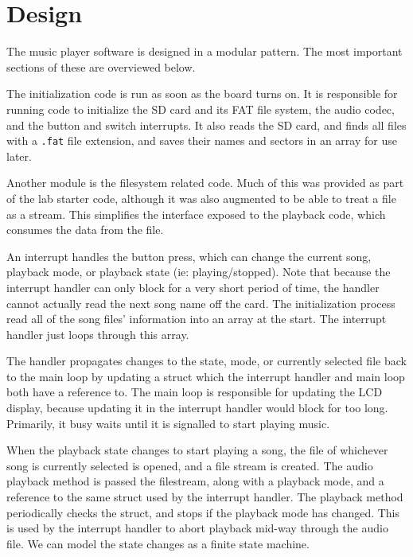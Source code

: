 \documentclass[12pt]{article}
\begin{document}
\doublespacing

\section{Design} %

The music player software is designed in a modular pattern.
The most important sections of these are overviewed below.

The initialization code is run as soon as the board turns on.
It is responsible for running code to initialize the SD card and its FAT file
system, the audio codec, and the button and switch interrupts.
It also reads the SD card, and finds all files with a \texttt{.fat} file
extension, and saves their names and sectors in an array for use later.

Another module is the filesystem related code.
Much of this was provided as part of the lab starter code, although it was also
augmented to be able to treat a file as a stream.
This simplifies the interface exposed to the playback code, which consumes the
data from the file.

An interrupt handles the button press, which can change the current song,
playback mode, or playback state (ie: playing/stopped).
Note that because the interrupt handler can only block for a very short period
of time, the handler cannot actually read the next song name off the card.
The initialization process read all of the song files' information into an
array at the start.
The interrupt handler just loops through this array.

The handler propagates changes to the state, mode, or currently selected file
back to the main loop by updating a struct which the interrupt handler and main
loop both have a reference to.
The main loop is responsible for updating the LCD display, because updating it
in the interrupt handler would block for too long.
Primarily, it busy waits until it is signalled to start playing music.

When the playback state changes to start playing a song, the file of whichever
song is currently selected is opened, and a file stream is created.
The audio playback method is passed the filestream, along with a playback mode,
and a reference to the same struct used by the interrupt handler.
The playback method periodically checks the struct, and stops if the playback
mode has changed.
This is used by the interrupt handler to abort playback mid-way through the audio
file.
We can model the state changes as a finite state machine.
\end{document}
